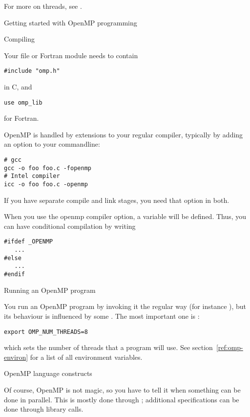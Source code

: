 For more on threads, see .

 {Getting started with OpenMP programming}

 {Compiling}

Your file or Fortran module needs to contain
\begin{verbatim}
#include "omp.h"
\end{verbatim}
in C, and 
\begin{verbatim}
use omp_lib
\end{verbatim}
for Fortran.

OpenMP is handled by extensions to your regular compiler, typically by
adding an option to your commandline:
\begin{verbatim}
# gcc
gcc -o foo foo.c -fopenmp
# Intel compiler
icc -o foo foo.c -openmp
\end{verbatim}
If you have separate compile and link stages, you need that option in both.

When you use the openmp compiler option, a  variable 
will be defined. Thus, you can have conditional compilation by writing
\begin{verbatim}
#ifdef _OPENMP
   ...
#else
   ...
#endif
\end{verbatim}


 {Running an OpenMP program}

You run an OpenMP program by invoking it the regular way (for instance ),
but its behaviour is influenced by some .
The most important one is :
\begin{verbatim}
export OMP_NUM_THREADS=8
\end{verbatim}
which sets the number of threads that a program will use.
See section~\ref{ref:omp-environ} for a list of all environment variables.


 {OpenMP language constructs}

Of course, OpenMP is not magic, so you have to tell it when something
can be done in parallel. This is mostly done through ;
additional specifications can be done through library calls.

